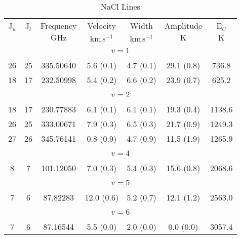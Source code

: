 \begin{table*}[htp]
\centering
\caption{NaCl Lines}
\begin{tabular}{ccccccc}
\label{tab:NaCl_salt_lines}
 J$_u$ & J$_l$ & Frequency & Velocity & Width & Amplitude & E$_U$ \\
  &  & $\mathrm{GHz}$ & $\mathrm{km\,s^{-1}}$ & $\mathrm{km\,s^{-1}}$ & $\mathrm{K}$ & $\mathrm{K}$ \\
\hline
&\vspace{-0.75em}\\
\multicolumn{7}{c}{$v = 1$} \\
\vspace{-0.75em}\\
 26 & 25 & 335.50640 & 5.6 (0.1) & 4.7 (0.1) & 29.1 (0.8) & 736.8 \\
 18 & 17 & 232.50998 & 5.4 (0.2) & 6.6 (0.2) & 23.9 (0.7) & 625.2 \\
&\vspace{-0.75em}\\
\multicolumn{7}{c}{$v = 2$} \\
\vspace{-0.75em}\\
 18 & 17 & 230.77883 & 6.1 (0.1) & 6.1 (0.1) & 19.3 (0.4) & 1138.6 \\
 26 & 25 & 333.00671 & 7.9 (0.3) & 6.5 (0.3) & 21.7 (0.9) & 1249.3 \\
 27 & 26 & 345.76141 & 0.8 (0.9) & 4.7 (0.9) & 11.5 (1.9) & 1265.9 \\
&\vspace{-0.75em}\\
\multicolumn{7}{c}{$v = 4$} \\
\vspace{-0.75em}\\
 8 & 7 & 101.12050 & 7.0 (0.3) & 5.4 (0.3) & 15.6 (0.8) & 2068.6 \\
&\vspace{-0.75em}\\
\multicolumn{7}{c}{$v = 5$} \\
\vspace{-0.75em}\\
 7 & 6 & 87.82283 & 12.0 (0.6) & 5.2 (0.7) & 12.1 (1.2) & 2563.0 \\
\hline
&\vspace{-0.75em}\\
\multicolumn{7}{c}{$v = 6$} \\
\vspace{-0.75em}\\
 7 & 6 & 87.16544 & 5.5 (0.0) & 2.0 (0.0) & 0.0 (0.0) & 3057.4 \\
\end{tabular}

\par 
\end{table*}
